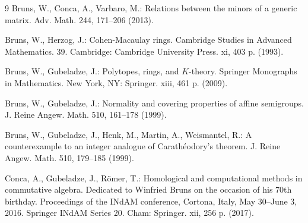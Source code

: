 \documentclass[10pt]{amsart}
\begin{document}
\begin{thebibliography}{9}
		 Bruns, W., Conca, A., Varbaro, M.: Relations between the minors of a generic matrix. Adv. Math. 244, 171--206 (2013).
		
		 Bruns, W., Herzog, J.: Cohen-Macaulay rings. Cambridge Studies in Advanced Mathematics. 39. Cambridge: Cambridge University Press. xi, 403 p. (1993).
		
		 Bruns, W., Gubeladze, J.: Polytopes, rings, and $K$-theory. Springer Monographs in Mathematics. New York, NY: Springer. xiii, 461 p. (2009).
		
		 Bruns, W., Gubeladze, J.: Normality and covering properties of affine semigroups. J. Reine Angew. Math. 510, 161--178 (1999). 
		
		 Bruns, W., Gubeladze, J., Henk, M., Martin, A., Weismantel, R.: A counterexample to an integer analogue of Carath\'{e}odory's theorem. J. Reine Angew. Math. 510, 179--185 (1999). 
		
		 Conca, A., Gubeladze, J., R\"{o}mer, T.: Homological and computational methods in commutative algebra. Dedicated to Winfried Bruns on the occasion of his 70th birthday. Proceedings of the INdAM conference, Cortona, Italy, May 30--June 3, 2016. Springer INdAM Series 20. Cham: Springer. xii, 256 p. (2017). 
	\end{thebibliography}
	
	
\end{document}
